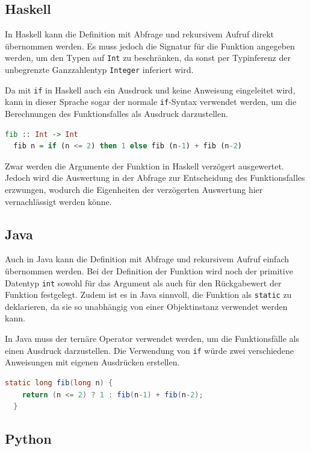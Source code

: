 \documentclass[11pt, parskip=half]{scrartcl}       %
\begin{document}
\subsection{Haskell}

In Haskell kann die Definition mit Abfrage und rekursivem Aufruf direkt übernommen werden.
Es muss jedoch die Signatur für die Funktion angegeben werden, um den Typen auf \texttt{Int} zu beschränken, da sonst per Typinferenz der unbegrenzte Ganzzahlentyp \texttt{Integer} inferiert wird.

Da mit \texttt{if} in Haskell auch ein Ausdruck und keine Anweisung eingeleitet wird, kann in dieser Sprache sogar der normale \texttt{if}-Syntax verwendet werden, um die Berechnungen des Funktionsfalles als Ausdruck darzustellen.

\begin{lstlisting}[language=haskell]
  fib :: Int -> Int
  fib n = if (n <= 2) then 1 else fib (n-1) + fib (n-2)
\end{lstlisting}

Zwar werden die Argumente der Funktion in Haskell verzögert ausgewertet.
Jedoch wird die Auswertung in der Abfrage zur Entscheidung des Funktionsfalles erzwungen, wodurch die Eigenheiten der verzögerten Auswertung hier vernachlässigt werden könne.


\subsection{Java}

Auch in Java kann die Definition mit Abfrage und rekursivem Aufruf einfach übernommen werden.
Bei der Definition der Funktion wird noch der primitive Datentyp \texttt{int} sowohl für das Argument als auch für den Rückgabewert der Funktion festgelegt.
Zudem ist es in Java sinnvoll, die Funktion als \texttt{static} zu deklarieren, da sie so unabhängig von einer Objektinstanz verwendet werden kann.

In Java muss der ternäre Operator verwendet werden, um die Funktionsfälle als einen Ausdruck darzustellen.
Die Verwendung von \texttt{if} würde zwei verschiedene Anweisungen mit eigenen Ausdrücken erstellen.

\begin{lstlisting}[language=java]
  static long fib(long n) {
    return (n <= 2) ? 1 : fib(n-1) + fib(n-2);
  }
\end{lstlisting}


\subsection{Python}
\end{document}
